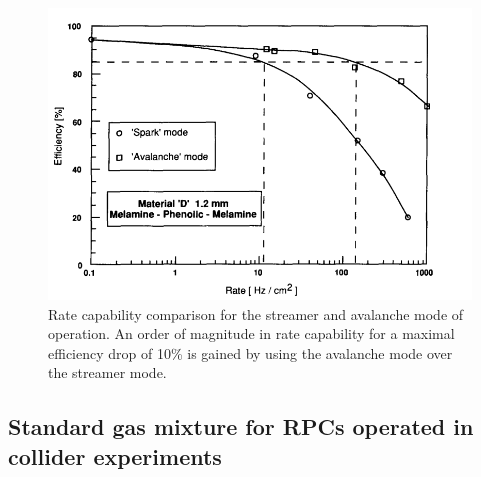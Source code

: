 	\begin{figure}[H]
		\centering
		\includegraphics[width = 0.7\linewidth]{fig/chapt3/Rate_Mode_Comparison.png}
		\caption{\label{fig:ModeRate} Rate capability comparison for the streamer and avalanche mode of operation. An order of magnitude in rate capability for a maximal efficiency drop of 10\% is gained by using the avalanche mode over the streamer mode.}
	\end{figure}
	
\newpage

	\subsection{Standard gas mixture for RPCs operated in collider experiments}
	\label{chat4:ssec:gasmix}
	
\begingroup\setlength{\intextsep}{0pt}\setlength{\columnsep}{15pt}
	

